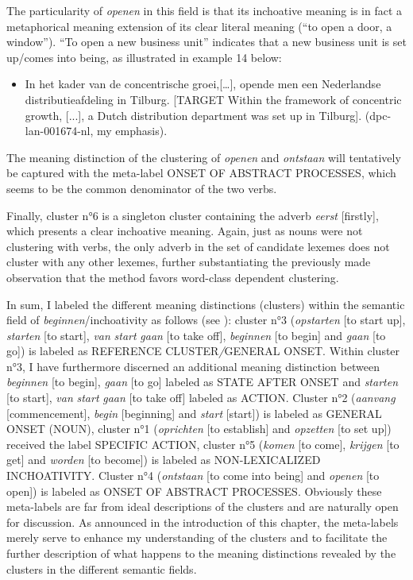 The particularity of \textit{openen} in this field is that its inchoative meaning is in fact a metaphorical meaning extension of its clear literal meaning (“to open a door, a window”). “To open a new business unit” indicates that a new business unit is set up/comes into being, as illustrated in example 14 below:

\begin{itemize}
\item \begin{styleVoorbeeld}
In het kader van de concentrische groei,[…], opende men een Nederlandse distributieafdeling in Tilburg. [TARGET Within the framework of concentric growth, [...], a Dutch distribution department was set up in Tilburg]. (dpc-lan-001674-nl, my emphasis).
\end{styleVoorbeeld}
\end{itemize}

The meaning distinction of the clustering of \textit{openen} and \textit{ontstaan} will tentatively be captured with the meta-label ONSET OF ABSTRACT PROCESSES, which seems to be the common denominator of the two verbs.

Finally, cluster n°6 is a singleton cluster containing the adverb \textit{eerst} [firstly], which presents a clear inchoative meaning. Again, just as nouns were not clustering with verbs, the only adverb in the set of candidate lexemes does not cluster with any other lexemes, further substantiating the previously made observation that the method favors word-class dependent clustering.

In sum, I labeled the different meaning distinctions (clusters) within the semantic field of \textit{beginnen}/inchoativity as follows (see ): cluster n°3 (\textit{opstarten} [to start up], \textit{starten} [to start], \textit{van} \textit{start} \textit{gaan} [to take off], \textit{beginnen} [to begin] and \textit{gaan} [to go]) is labeled as REFERENCE CLUSTER\textit{/}GENERAL ONSET. Within cluster n°3, I have furthermore discerned an additional meaning distinction between \textit{beginnen} [to begin], \textit{gaan} [to go] labeled as STATE AFTER ONSET and \textit{starten} [to start], \textit{van} \textit{start} \textit{gaan} [to take off] labeled as ACTION. Cluster n°2 (\textit{aanvang} [commencement], \textit{begin} [beginning] and \textit{start} [start]) is labeled as GENERAL ONSET (NOUN), cluster n°1 (\textit{oprichten} [to establish] and \textit{opzetten} [to set up]) received the label {SPECIFIC} ACTION, cluster n°5 (\textit{komen} [to come], \textit{krijgen} [to get] and \textit{worden} [to become]) is labeled as {NON-LEXICALIZED INCHOATIVITY}. Cluster n°4 (\textit{ontstaan} [to come into being] and \textit{openen} [to open]) is labeled as {ONSET OF ABSTRACT PROCESSES}. Obviously these meta-labels are far from ideal descriptions of the clusters and are naturally open for discussion. As announced in the introduction of this chapter, the meta-labels merely serve to enhance my understanding of the clusters and to facilitate the further description of what happens to the meaning distinctions revealed by the clusters in the different semantic fields.

